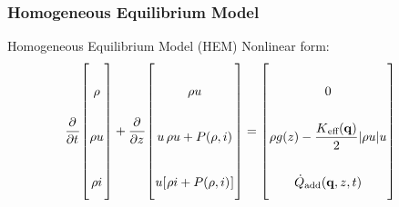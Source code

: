 \documentclass[10pt,t,xcolor=table]{beamer}
\begin{document}
    \subsubsection*{Homogeneous Equilibrium Model}
    \begin{frame}{Homogeneous Equilibrium Model (HEM)}
        Nonlinear form:
        \begin{equation}
            \hspace{-1em}
            \renewcommand*{\arraystretch}{3}
            \pdiff{}{t}\begin{bmatrix}
                            \rho \\
                            \rhou \\
                            \rhoi 
                        \end{bmatrix}
            + 
            \pdiff{}{z}\begin{bmatrix}
                            \rhou                 \\
                            u\,\rhou + P(\rho,i)   \\
                            u\left[\rhoi  + P(\rho,i)\right]
                        \end{bmatrix}
            =  
                        \begin{bmatrix}
                            0 \\%
                            \rho{g(z)} - \frac{\Keff(\qCon)}{2} |\rhou|u  \\
                            \dot{Q}\subs{add}(\qCon,z,t)
                        \end{bmatrix}
            \label{Eqn:HEMStrongConservative}
        \end{equation}
    \end{frame}
\end{document}
